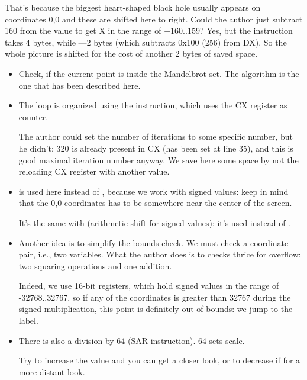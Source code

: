 \begin{itemize}
That's because the biggest heart-shaped black hole usually appears on coordinates 0,0 and these are shifted
here to right.
Could the author just 
subtract 160 from the value to get X in the range of $-160..159$? 
Yes, but the instruction  takes 4 bytes, 
while ---2 bytes 
(which subtracts 0x100 (256) from DX). 
So the whole picture is shifted for the cost of 
another 2 bytes of saved space.

    \begin{itemize}
    \item Check, if the current 
point is inside the Mandelbrot set.
          The algorithm is the one that has been described here.
     \item The loop 
is organized using the  instruction, which uses the CX register as counter.

The author could set the number of iterations to some specific number, but he didn't: 320 is already present in CX 
(has been set at line 35), and this is good maximal iteration number anyway.
We save here some space 
by not the reloading CX register with another value.

     \item 
{} is used here instead of , because we work with signed values: 
keep in mind that the 0,0 coordinates has to be somewhere near the center of the screen.

It's the same with  (arithmetic shift for signed values): it's used instead of .

     \item Another idea is to simplify the bounds check.
We must check a coordinate pair, i.e., two variables.
What the author does is to checks thrice for overflow: two squaring operations and one addition.

Indeed, we use 16-bit registers, which hold signed values in the range of -32768..32767, 
so if any of the coordinates is greater than 32767 during the signed multiplication, this point is definitely out 
of bounds: we jump to the  label.

     \item 
There is also a division by 64 (SAR instruction). 64 sets scale.

Try to increase the value and you can get a closer look, or to decrease if for a more distant look.

    \end{itemize}


\end{itemize}
